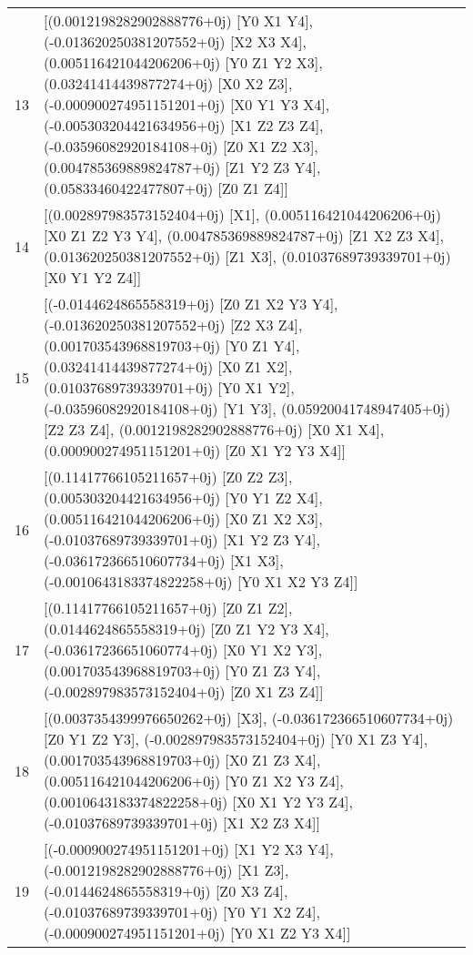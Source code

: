 \begin{tabular}{rl}
      13 &  [(0.0012198282902888776+0j) [Y0 X1 Y4], (-0.013620250381207552+0j) [X2 X3 X4], (0.005116421044206206+0j) [Y0 Z1 Y2 X3], (0.03241414439877274+0j) [X0 X2 Z3], (-0.000900274951151201+0j) [X0 Y1 Y3 X4], (-0.005303204421634956+0j) [X1 Z2 Z3 Z4], (-0.03596082920184108+0j) [Z0 X1 Z2 X3], (0.004785369889824787+0j) [Z1 Y2 Z3 Y4], (0.05833460422477807+0j) [Z0 Z1 Z4]] \\
      14 &                                                                                                                                                                         [(0.002897983573152404+0j) [X1], (0.005116421044206206+0j) [X0 Z1 Z2 Y3 Y4], (0.004785369889824787+0j) [Z1 X2 Z3 X4], (0.013620250381207552+0j) [Z1 X3], (0.01037689739339701+0j) [X0 Y1 Y2 Z4]] \\
      15 &            [(-0.0144624865558319+0j) [Z0 Z1 X2 Y3 Y4], (-0.013620250381207552+0j) [Z2 X3 Z4], (0.001703543968819703+0j) [Y0 Z1 Y4], (0.03241414439877274+0j) [X0 Z1 X2], (0.01037689739339701+0j) [Y0 X1 Y2], (-0.03596082920184108+0j) [Y1 Y3], (0.05920041748947405+0j) [Z2 Z3 Z4], (0.0012198282902888776+0j) [X0 X1 X4], (0.000900274951151201+0j) [Z0 X1 Y2 Y3 X4]] \\
      16 &                                                                                                                       [(0.11417766105211657+0j) [Z0 Z2 Z3], (0.005303204421634956+0j) [Y0 Y1 Z2 X4], (0.005116421044206206+0j) [X0 Z1 X2 X3], (-0.01037689739339701+0j) [X1 Y2 Z3 Y4], (-0.036172366510607734+0j) [X1 X3], (-0.0010643183374822258+0j) [Y0 X1 X2 Y3 Z4]] \\
      17 &                                                                                                                                                              [(0.11417766105211657+0j) [Z0 Z1 Z2], (0.0144624865558319+0j) [Z0 Z1 Y2 Y3 X4], (-0.03617236651060774+0j) [X0 Y1 X2 Y3], (0.001703543968819703+0j) [Y0 Z1 Z3 Y4], (-0.002897983573152404+0j) [Z0 X1 Z3 Z4]] \\
      18 &                                                                         [(0.0037354399976650262+0j) [X3], (-0.036172366510607734+0j) [Z0 Y1 Z2 Y3], (-0.002897983573152404+0j) [Y0 X1 Z3 Y4], (0.001703543968819703+0j) [X0 Z1 Z3 X4], (0.005116421044206206+0j) [Y0 Z1 X2 Y3 Z4], (0.0010643183374822258+0j) [X0 X1 Y2 Y3 Z4], (-0.01037689739339701+0j) [X1 X2 Z3 X4]] \\
      19 &                                                                                                                                                               [(-0.000900274951151201+0j) [X1 Y2 X3 Y4], (-0.0012198282902888776+0j) [X1 Z3], (-0.0144624865558319+0j) [Z0 X3 Z4], (-0.01037689739339701+0j) [Y0 Y1 X2 Z4], (-0.000900274951151201+0j) [Y0 X1 Z2 Y3 X4]] \\

\end{tabular}
